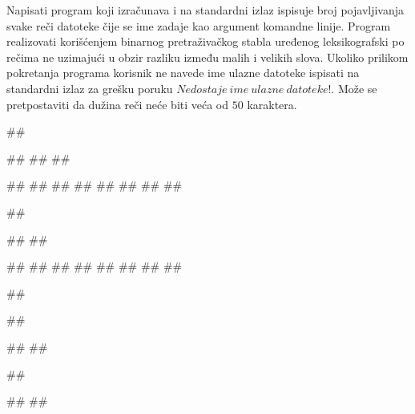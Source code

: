 \begin{Answer}[ref=4_14]
\end{Answer}

\begin{Exercise}[label=4_15]
Napisati program koji izračunava i na standardni izlaz ispisuje broj pojavljivanja svake reči datoteke čije se ime zadaje kao argument komandne linije. Program realizovati korišćenjem binarnog pretraživačkog stabla uređenog leksikografski po rečima ne uzimajući u obzir razliku između malih i velikih slova. Ukoliko prilikom pokretanja programa korisnik ne navede ime ulazne datoteke ispisati na standardni izlaz za grešku poruku $Nedostaje\ ime\ ulazne\ datoteke!$. Može se pretpostaviti da dužina reči neće biti veća od $50$ karaktera.

\begin{miditest}
\begin{test}{1}
##
  
##
##
##

#\naslovIzlaz#
##
##
##
##
##
#\izlaz{}#
##
\end{test}
\end{miditest}
\begin{miditest}
\begin{test}{2}
##

##
##

#\naslovIzlaz#
##
##
##
##
#\izlaz{}#
##
##
\end{test}
\end{miditest}

\begin{miditest}
\begin{test}{3}
##

##

#\naslovIzlazZaGresku#
##
\end{test}
\end{miditest}
\begin{miditest}
\begin{test}{4}
##
  
#\naslovIzlazZaGresku#
##
\end{test}
\end{miditest}
\end{Exercise}

